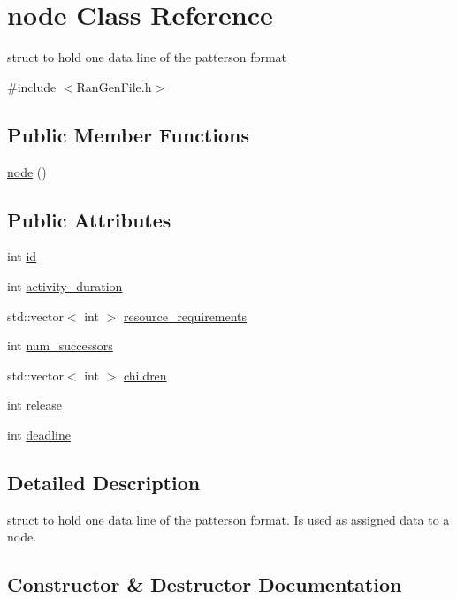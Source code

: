 \hypertarget{classnode}{}\section{node Class Reference}
\label{classnode}


struct to hold one data line of the patterson format  




{\ttfamily \#include $<$Ran\+Gen\+File.\+h$>$}

\subsection*{Public Member Functions}
\begin{DoxyCompactItemize}
\item 
\hyperlink{classnode_a82669b7358b50bd8d7888d7df4ff8dfa}{node} ()
\end{DoxyCompactItemize}
\subsection*{Public Attributes}
\begin{DoxyCompactItemize}
\item 
int \hyperlink{classnode_a8ceaa10e39f74fdfdae30c68a50074e2}{id}
\item 
int \hyperlink{classnode_aaf1da6e3f459a2e0c1dc2f961302b9f7}{activity\+\_\+duration}
\item 
std\+::vector$<$ int $>$ \hyperlink{classnode_a34b5f0e866924cecdda4165b565ea571}{resource\+\_\+requirements}
\item 
int \hyperlink{classnode_a2e9517cedd7c74a4457a051eb8052f20}{num\+\_\+successors}
\item 
std\+::vector$<$ int $>$ \hyperlink{classnode_a8ee984c8aeb539ee4d0cf783b446e6db}{children}
\item 
int \hyperlink{classnode_a7c1bb8ed64a6dd9c79de878e364d5456}{release}
\item 
int \hyperlink{classnode_ae5efb113f01f63fe487d29053a55275a}{deadline}
\end{DoxyCompactItemize}


\subsection{Detailed Description}
struct to hold one data line of the patterson format. Is used as assigned data to a node. 

\subsection{Constructor \& Destructor Documentation}
\hypertarget{classnode_a82669b7358b50bd8d7888d7df4ff8dfa}{}
